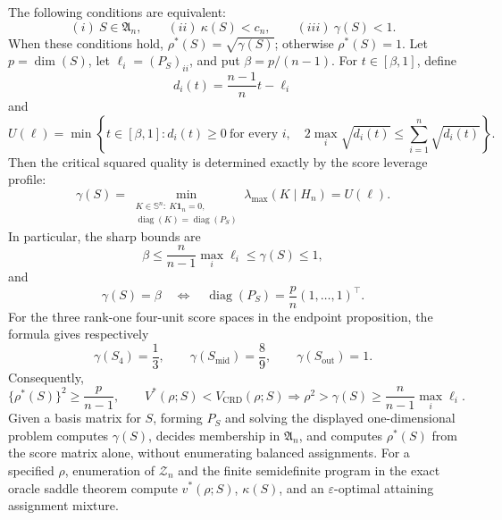 The following conditions are equivalent:
\[
(i)\ S\in\mathfrak A_n,
\qquad
(ii)\ \kappa(S)<c_n,
\qquad
(iii)\ \gamma(S)<1.
\]
When these conditions hold, \(\rho^*(S)=\sqrt{\gamma(S)}\); otherwise \(\rho^*(S)=1\).  Let \(p=\dim(S)\), let \(\ell_i=(P_S)_{ii}\), and put \(\beta=p/(n-1)\).  For \(t\in[\beta,1]\), define
\[
d_i(t)=\frac{n-1}{n}t-\ell_i
\]
and
\[
U(\ell)=\min\left\{t\in[\beta,1]:d_i(t)\geq0\ \text{for every }i,\quad
2\max_i\sqrt{d_i(t)}\leq\sum_{i=1}^n\sqrt{d_i(t)}\right\}.
\]
Then the critical squared quality is determined exactly by the score leverage profile:
\[
\gamma(S)
=\min_{\substack{K\in\mathbb S^n:\ K\mathbf1_n=0,\\
\operatorname{diag}(K)=\operatorname{diag}(P_S)}}
\lambda_{\max}(K\mid H_n)
=U(\ell).
\]
In particular, the sharp bounds are
\[
\beta\leq\frac{n}{n-1}\max_i\ell_i\leq\gamma(S)\leq1,
\]
and
\[
\gamma(S)=\beta
\quad\Longleftrightarrow\quad
\operatorname{diag}(P_S)=\frac{p}{n}(1,\ldots,1)^\top.
\]
For the three rank-one four-unit score spaces in the endpoint proposition, the formula gives respectively
\[
\gamma(S_4)=\frac13,
\qquad
\gamma(S_{\mathrm{mid}})=\frac89,
\qquad
\gamma(S_{\mathrm{out}})=1.
\]
Consequently,
\[
\{\rho^*(S)\}^2\geq\frac{p}{n-1},
\qquad
V^*(\rho;S)<V_{\mathrm{CRD}}(\rho;S)
\Longrightarrow
\rho^2>\gamma(S)\geq\frac{n}{n-1}\max_i\ell_i.
\]
Given a basis matrix for \(S\), forming \(P_S\) and solving the displayed one-dimensional problem computes \(\gamma(S)\), decides membership in \(\mathfrak A_n\), and computes \(\rho^*(S)\) from the score matrix alone, without enumerating balanced assignments.  For a specified \(\rho\), enumeration of \(\mathcal Z_n\) and the finite semidefinite program in the exact oracle saddle theorem compute \(v^*(\rho;S)\), \(\kappa(S)\), and an \(\varepsilon\)-optimal attaining assignment mixture.